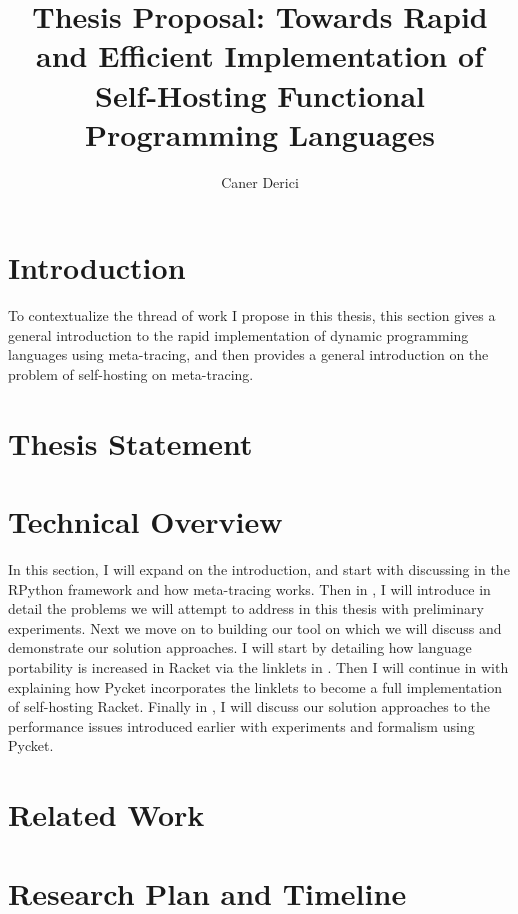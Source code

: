 \documentclass[9pt]{extarticle}
\title{Thesis Proposal: Towards Rapid and Efficient Implementation
  of Self-Hosting Functional Programming Languages}
\author{Caner Derici}
\begin{document}


\maketitle

\begin{abstract}
\end{abstract}

\tableofcontents

\newpage

\section{Introduction}
\label{sec:intro}

To contextualize the thread of work I propose in this thesis, this
section gives a general introduction to the rapid implementation of
dynamic programming languages using meta-tracing, and then provides a
general introduction on the problem of self-hosting on meta-tracing.


\section{Thesis Statement}
\label{sec:thesis}


\section{Technical Overview}
\label{sec:technical}

In this section, I will expand on the introduction, and start with
discussing in  the RPython framework and how
meta-tracing works. Then in , I will
introduce in detail the problems we will attempt to address in this
thesis with preliminary experiments. Next we move on to building our
tool on which we will discuss and demonstrate our solution
approaches. I will start by detailing how language portability is
increased in Racket via the linklets in . Then
I will continue in  with explaining how Pycket
incorporates the linklets to become a full implementation of
self-hosting Racket. Finally in , I will
discuss our solution approaches to the performance issues introduced
earlier with experiments and formalism using Pycket.


\section{Related Work}
\label{sec:related}


\section{Research Plan and Timeline}
\label{sec:timeline}


\printbibliography
\end{document}
